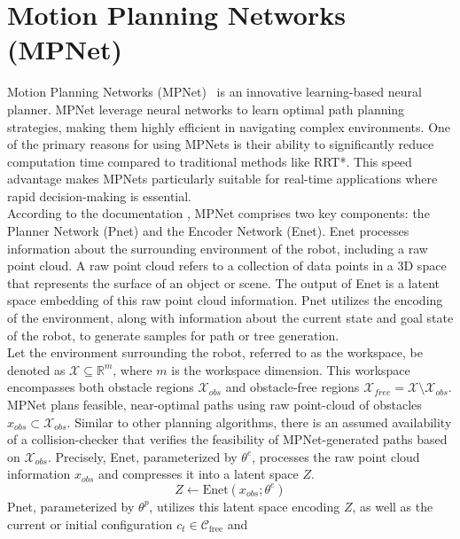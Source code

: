 \documentclass{ctuthesis}
\begin{document}
\section{Motion Planning Networks (MPNet)}
Motion Planning Networks (MPNet)~\cite{Ahmed2019MotionPlanningNetworks} is an 
innovative learning-based neural planner.  
MPNet  leverage neural networks to learn optimal path planning strategies, 
making them highly efficient in navigating complex environments.  
One of the primary reasons for using MPNets is their ability to 
significantly reduce computation time compared to traditional methods like RRT*. 
This speed advantage makes MPNets particularly suitable for real-time applications where 
rapid decision-making is essential.
\\[12pt]
According to the documentation \cite{Ahmed2019MotionPlanningNetworks}, 
MPNet comprises two key components: the Planner Network (Pnet) and the Encoder Network (Enet). 
Enet processes information about the surrounding environment of the robot, 
including a raw point cloud. 
A raw point cloud refers to a collection of data points in a 3D space that 
represents the surface of an object or scene.
The output of Enet is a latent space embedding of this raw point cloud information. 
Pnet utilizes the encoding of the environment, 
along with information about the current state and goal state of the robot, 
to generate samples for path or tree generation.
\\[12pt]
Let the environment surrounding the robot, 
referred to as the workspace, 
be denoted as \(\mathcal{X} \subseteq \mathbb{R}^m\), where \(m\) is the workspace dimension. 
This workspace encompasses both obstacle regions \(\mathcal{X}_{obs}\) and 
obstacle-free regions \(\mathcal{X}_{free} = \mathcal{X} \setminus \mathcal{X}_{obs}\). 
MPNet plans feasible, 
near-optimal paths using raw point-cloud of obstacles \(x_{obs} \subset \mathcal{X}_{obs}\). 
Similar to other planning algorithms, 
there is an assumed availability of a collision-checker 
that verifies the feasibility of MPNet-generated paths based on \(\mathcal{X}_{obs}\).
Precisely, Enet, parameterized by \( \theta^e \), 
processes the raw point cloud information \( x_{obs} \) and 
compresses it into a latent space \(Z\). 
\[
  Z \leftarrow \text{Enet}(x_{obs}; \theta^e)
\]
Pnet, parameterized by \( \theta^p \), utilizes this latent space encoding \(Z\), 
as well as the current or initial configuration \(c_t \in \mathcal{C}_{\text{free}}\) and 
\end{document}
